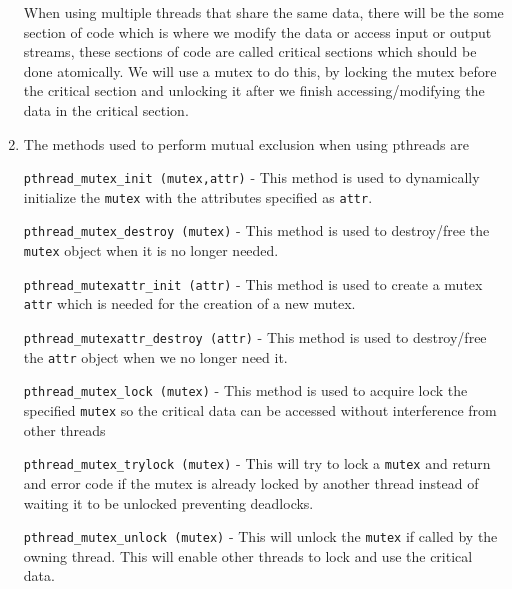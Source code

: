 \documentclass[12pt]{article}
\begin{document}
\begin{enumerate}
When using multiple threads that share the same data, there will
be the some section of code which is where we modify the data or
access input or output streams, these sections of code are called
critical sections which should be done atomically. We will use a
mutex to do this, by locking the mutex before the critical section
and unlocking it after we finish accessing/modifying the data in
the critical section.

\item The methods used to perform mutual exclusion when using pthreads are

\texttt{pthread\_mutex\_init (mutex,attr)} - This method is used to
dynamically initialize the \texttt{mutex} with the attributes specified as
\texttt{attr}.

\texttt{pthread\_mutex\_destroy (mutex)} - This method is used to
destroy/free the \texttt{mutex} object when it is no longer needed.

\texttt{pthread\_mutexattr\_init (attr)} - This method is used to create
a mutex \texttt{attr} which is needed for the creation of a new mutex.

\texttt{pthread\_mutexattr\_destroy (attr)} - This method is used to
destroy/free the \texttt{attr} object when we no longer need it.

\texttt{pthread\_mutex\_lock (mutex)} - This method is used to acquire
lock the specified \texttt{mutex} so the critical data can be accessed
without interference from other threads

\texttt{pthread\_mutex\_trylock (mutex)} - This will try to lock a \texttt{mutex}
and return and error code if the mutex is already locked by
another thread instead of waiting it to be unlocked preventing
deadlocks.

\texttt{pthread\_mutex\_unlock (mutex)} - This will unlock the \texttt{mutex} if
called by the owning thread. This will enable other threads to
lock and use the critical data.
\end{enumerate}
\end{document}
